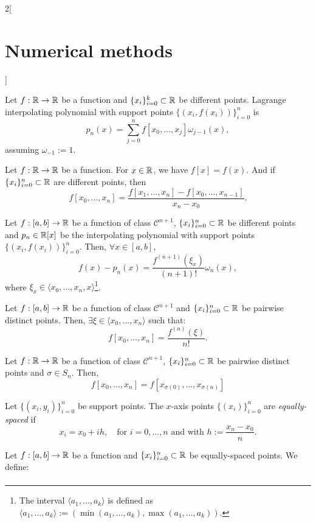 \documentclass[../../../main.tex]{subfiles}
\begin{document}
\begin{multicols}{2}[\section{Numerical methods}]
\begin{definition}
\end{definition}
\begin{prop}
    Let $f:\mathbb{R}\rightarrow\mathbb{R}$ be a function and $\{x_i\}_{i=0}^k\subset\mathbb{R}$ be different points. Lagrange interpolating polynomial with support points $\{(x_i,f(x_i))\}_{i=0}^n$ is $$p_n(x)=\sum_{j=0}^nf[x_0,\ldots,x_j]\omega_{j-1}(x),$$ assuming $\omega_{-1}:=1$.
\end{prop}
\begin{prop}
    Let $f:\mathbb{R}\rightarrow\mathbb{R}$ be a function. For $x\in\mathbb{R}$, we have $f[x]=f(x)$. And if $\{x_i\}_{i=0}^n\subset\mathbb{R}$ are different points, then $$f[x_0,\ldots,x_n]=\frac{f[x_1,\ldots,x_n]-f[x_0,\ldots,x_{n-1}]}{x_n-x_0}.$$ 
\end{prop}
\begin{theorem}
    Let $f:[a,b]\rightarrow\mathbb{R}$ be a function of class $\mathcal{C}^{n+1}$, $\{x_i\}_{i=0}^n\subset\mathbb{R}$ be different  points and $p_n\in\mathbb{R}[x]$ be the interpolating polynomial with support points $\{(x_i,f(x_i))\}_{i=0}^n$. Then, $\forall x\in[a,b]$, $$f(x)-p_n(x)=\frac{f^{(n+1)}(\xi_x)}{(n+1)!}\omega_n(x),$$ where $\xi_x\in\langle x_0,\ldots,x_n,x\rangle$\footnote{The interval $\langle a_1,\ldots,a_k\rangle$ is defined as $\langle a_1,\ldots,a_k\rangle:=(\min(a_1,\ldots,a_k),\max(a_1,\ldots,a_k))$.}.
\end{theorem}
\begin{lemma}
    Let $f:[a,b]\rightarrow\mathbb{R}$ be a function of class $\mathcal{C}^{n+1}$ and $\{x_i\}_{i=0}^n\subset\mathbb{R}$ be pairwise distinct points. Then, $\exists\xi\in\langle x_0,\ldots,x_n\rangle$ such that: $$f[x_0,\ldots,x_n]=\frac{f^{(n)}(\xi)}{n!}.$$ 
\end{lemma}
\begin{prop}
    Let $f:\mathbb{R}\rightarrow\mathbb{R}$ be a function of class $\mathcal{C}^{n+1}$, $\{x_i\}_{i=0}^n\subset\mathbb{R}$ be pairwise distinct points and $\sigma\in S_n$. Then, $$f[x_0,\ldots,x_n]=f[x_{\sigma(0)},\ldots,x_{\sigma(n)}]$$
\end{prop}
\begin{definition}
    Let $\{(x_i,y_i)\}_{i=0}^n$ be support points. The $x$-axis points $\{(x_i)\}_{i=0}^n$ are \textit{equally-spaced} if $$x_i=x_0+ih,\quad\text{for }i=0,\ldots,n\text{ and with }h:=\frac{x_n-x_0}{n}.$$
\end{definition}
\begin{definition}
    Let $f:[a,b]\rightarrow\mathbb{R}$ be a function and $\{x_i\}_{i=0}^n\subset\mathbb{R}$ be equally-spaced points. We define:
    \begin{gather*}

\end{gather*}
\end{definition}
\end{multicols}
\end{document}
